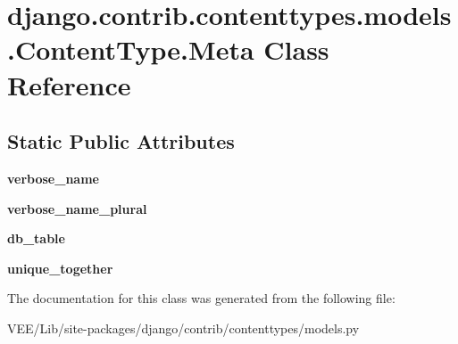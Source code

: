 \hypertarget{classdjango_1_1contrib_1_1contenttypes_1_1models_1_1_content_type_1_1_meta}{}\section{django.\+contrib.\+contenttypes.\+models.\+Content\+Type.\+Meta Class Reference}
\label{classdjango_1_1contrib_1_1contenttypes_1_1models_1_1_content_type_1_1_meta}
\subsection*{Static Public Attributes}
\begin{DoxyCompactItemize}
\item 
\mbox{\label{classdjango_1_1contrib_1_1contenttypes_1_1models_1_1_content_type_1_1_meta_a9156bd7b308ba88971f277b85719912e}} 
{\bfseries verbose\+\_\+name}
\item 
\mbox{\label{classdjango_1_1contrib_1_1contenttypes_1_1models_1_1_content_type_1_1_meta_abd0ff06da43fc3ea4e69362bc1d076a5}} 
{\bfseries verbose\+\_\+name\+\_\+plural}
\item 
\mbox{\label{classdjango_1_1contrib_1_1contenttypes_1_1models_1_1_content_type_1_1_meta_afe78492f5c49e8c0c05c7ece75222139}} 
{\bfseries db\+\_\+table}
\item 
\mbox{\label{classdjango_1_1contrib_1_1contenttypes_1_1models_1_1_content_type_1_1_meta_a987836e6b38683e2e44efa6378a3395a}} 
{\bfseries unique\+\_\+together}
\end{DoxyCompactItemize}


The documentation for this class was generated from the following file\+:\begin{DoxyCompactItemize}
\item 
V\+E\+E/\+Lib/site-\/packages/django/contrib/contenttypes/models.\+py\end{DoxyCompactItemize}
